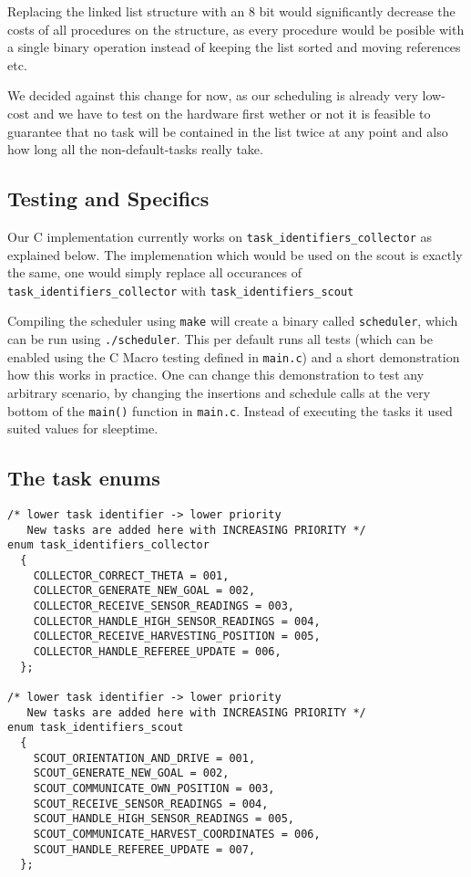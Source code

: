 \documentclass[12pt]{article}
\begin{document}
Replacing the linked list structure with an 8 bit would significantly decrease the costs of all procedures on the structure, as every procedure would be posible with a single binary operation instead of keeping the list sorted and moving references etc.

We decided against this change for now, as our scheduling is already very low-cost and we have to test on the hardware first wether or not it is feasible to guarantee that no task will be contained in the list twice at any point and also how long all the non-default-tasks really take.


\subsection*{Testing and Specifics}
Our C implementation currently works on \verb!task_identifiers_collector! as explained below. The implemenation which would be used on the scout is exactly the same, one would simply replace all occurances of \verb!task_identifiers_collector! with \verb!task_identifiers_scout!

Compiling the scheduler using \verb!make! will create a binary called \verb!scheduler!, which can be run using \verb!./scheduler!. This per default runs all tests (which can be enabled using the C Macro testing defined in \verb!main.c!) and a short demonstration how this works in practice. One can change this demonstration to test any arbitrary scenario, by changing the insertions and schedule calls at the very bottom of the \verb!main()! function in \verb!main.c!. Instead of executing the tasks it used suited values for sleeptime.

\newpage
\subsection*{The task enums}

\begin{lstlisting}[]
/* lower task identifier -> lower priority
   New tasks are added here with INCREASING PRIORITY */
enum task_identifiers_collector
  {
    COLLECTOR_CORRECT_THETA = 001,
    COLLECTOR_GENERATE_NEW_GOAL = 002,
    COLLECTOR_RECEIVE_SENSOR_READINGS = 003,
    COLLECTOR_HANDLE_HIGH_SENSOR_READINGS = 004,
    COLLECTOR_RECEIVE_HARVESTING_POSITION = 005,
    COLLECTOR_HANDLE_REFEREE_UPDATE = 006,
  };

/* lower task identifier -> lower priority
   New tasks are added here with INCREASING PRIORITY */
enum task_identifiers_scout
  {
    SCOUT_ORIENTATION_AND_DRIVE = 001,
    SCOUT_GENERATE_NEW_GOAL = 002,
    SCOUT_COMMUNICATE_OWN_POSITION = 003,
    SCOUT_RECEIVE_SENSOR_READINGS = 004,
    SCOUT_HANDLE_HIGH_SENSOR_READINGS = 005,
    SCOUT_COMMUNICATE_HARVEST_COORDINATES = 006,
    SCOUT_HANDLE_REFEREE_UPDATE = 007,
  };
\end{lstlisting}
\end{document}
